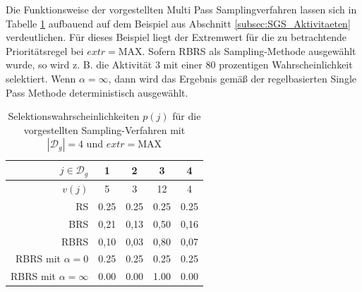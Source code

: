 Die Funktionsweise der vorgestellten Multi Pass Samplingverfahren lassen sich in Tabelle \ref{tab:ExampleSampling} aufbauend auf dem Beispiel aus Abschnitt \ref{subsec:SGS_Aktivitaeten} verdeutlichen. Für dieses Beispiel liegt der Extremwert für die zu betrachtende Prioritätsregel bei $extr = \text{MAX}$. Sofern \ac{RBRS} als Sampling-Methode ausgewählt wurde, so wird z. B. die Aktivität 3 mit einer 80 prozentigen Wahrscheinlichkeit selektiert. Wenn $\alpha = \infty$, dann wird das Ergebnis gemäß der regelbasierten Single Pass Methode deterministisch ausgewählt.  




\begin{table}[H]
\centering
\begin{tabular}{r|l|l|l|l}
$j \in \mathcal{D}_g$                      & \multicolumn{1}{c|}{1} & \multicolumn{1}{c|}{2} & \multicolumn{1}{c|}{3}  & \multicolumn{1}{c}{4} \\ \hline
$v(j)$                                     & \multicolumn{1}{c|}{5} & \multicolumn{1}{c|}{3} & \multicolumn{1}{c|}{12} & \multicolumn{1}{c}{4} \\ \Xhline{2\arrayrulewidth}
\acf{RS} & 0.25                   & 0.25                   & 0.25                    & 0.25                  \\ \hline
\acf{BRS}& 0,21                   & 0,13                   & 0,50                    & 0,16                  \\ \hline
\acf{RBRS} & 0,10                   & 0,03                   & 0,80                    & 0,07                  \\ \hline
\ac{RBRS} mit $\alpha = 0$                      & 0.25                   & 0.25                   & 0.25                    & 0.25                  \\ \hline
\ac{RBRS} mit $\alpha = \infty$                      & 0.00                   & 0.00                   & 1.00                    & 0.00                 
\end{tabular}
\caption{Selektionswahrscheinlichkeiten $p(j)$ für die vorgestellten Sampling-Verfahren mit $|\mathcal{D}_g| = 4$ und $extr = \text{MAX}$ }
\label{tab:ExampleSampling}
\end{table}
